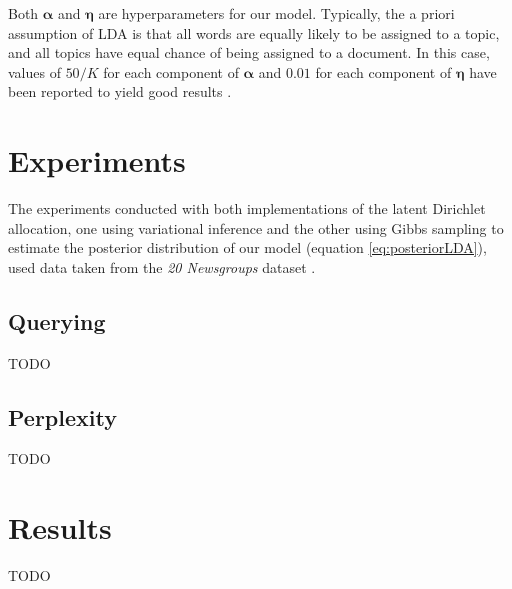 \documentclass{article}
\begin{document}
Both $\bm{\alpha}$ and $\bm{\eta}$ are hyperparameters for our model. Typically, the a priori assumption of LDA is that all words are equally likely to be assigned to a topic, and all topics have equal chance of being assigned to a document. In this case, values of $50/K$ for each component of $\bm{\alpha}$ and $0.01$ for each component of $\bm{\eta}$ have been reported to yield good results \cite{griffiths2004finding}.

\section{Experiments}
The experiments conducted with both implementations of the latent Dirichlet allocation, one using variational inference and the other using Gibbs sampling to estimate the posterior distribution of our model (equation \ref{eq:posteriorLDA}), used data taken from the \textit{20 Newsgroups} dataset \cite{20_newsgroups}.

\subsection{Querying}
TODO

\subsection{Perplexity}
TODO

\section{Results}
TODO

\nocite{blei2012probabilistic}



\end{document}
